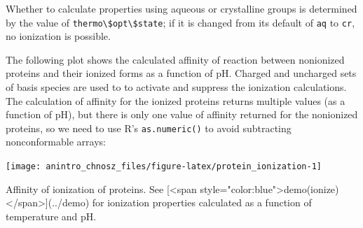 \documentclass[]{tufte-handout}
\begin{document}
\begin{marginfigure}
Whether to calculate properties using aqueous or crystalline groups is
determined by the value of
\texttt{thermo\textbackslash{}\$opt\textbackslash{}\$state}; if it is
changed from its default of \texttt{aq} to \texttt{cr}, no ionization is
possible.
\end{marginfigure}

The following plot shows the calculated affinity of reaction between
nonionized proteins and their ionized forms as a function of pH. Charged
and uncharged sets of basis species are used to to activate and suppress
the ionization calculations. The calculation of affinity for the ionized
proteins returns multiple values (as a function of pH), but there is
only one value of affinity returned for the nonionized proteins, so we
need to use R's \texttt{as.numeric()} to avoid subtracting
nonconformable arrays:

\begin{marginfigure}
\texttt{[image: anintro\_chnosz\_files/figure-latex/protein\_ionization-1]} \caption[Affinity of ionization of proteins]{Affinity of ionization of proteins. See [<span style="color:blue">demo(ionize)</span>](../demo) for ionization properties calculated as a function of temperature and pH.}\label{fig:protein_ionization}
\end{marginfigure}
\end{document}
